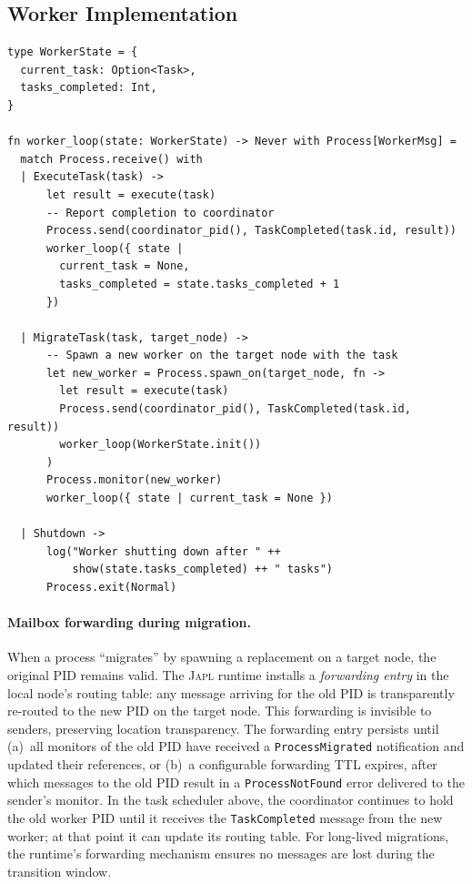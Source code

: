 \documentclass[11pt,a4paper]{article}
\newcommand{\japl}{\textsc{Japl}}
\begin{document}
\subsection{Worker Implementation}

\begin{lstlisting}
type WorkerState = {
  current_task: Option<Task>,
  tasks_completed: Int,
}

fn worker_loop(state: WorkerState) -> Never with Process[WorkerMsg] =
  match Process.receive() with
  | ExecuteTask(task) ->
      let result = execute(task)
      -- Report completion to coordinator
      Process.send(coordinator_pid(), TaskCompleted(task.id, result))
      worker_loop({ state |
        current_task = None,
        tasks_completed = state.tasks_completed + 1
      })

  | MigrateTask(task, target_node) ->
      -- Spawn a new worker on the target node with the task
      let new_worker = Process.spawn_on(target_node, fn ->
        let result = execute(task)
        Process.send(coordinator_pid(), TaskCompleted(task.id, result))
        worker_loop(WorkerState.init())
      )
      Process.monitor(new_worker)
      worker_loop({ state | current_task = None })

  | Shutdown ->
      log("Worker shutting down after " ++
          show(state.tasks_completed) ++ " tasks")
      Process.exit(Normal)
\end{lstlisting}

\paragraph{Mailbox forwarding during migration.}
When a process ``migrates'' by spawning a replacement on a target node, the
original PID remains valid. The \japl{} runtime installs a \emph{forwarding
entry} in the local node's routing table: any message arriving for the old
PID is transparently re-routed to the new PID on the target node. This
forwarding is invisible to senders, preserving location transparency. The
forwarding entry persists until (a)~all monitors of the old PID have
received a \texttt{ProcessMigrated} notification and updated their
references, or (b)~a configurable forwarding TTL expires, after which
messages to the old PID result in a \texttt{ProcessNotFound} error
delivered to the sender's monitor. In the task scheduler above, the
coordinator continues to hold the old worker PID until it receives the
\texttt{TaskCompleted} message from the new worker; at that point it can
update its routing table. For long-lived migrations, the runtime's
forwarding mechanism ensures no messages are lost during the transition
window.
\end{document}
